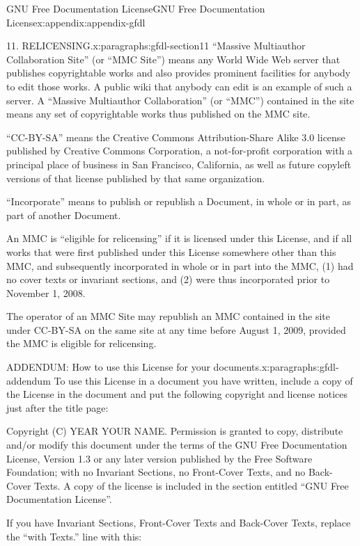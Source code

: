 \documentclass[oneside,10pt,]{book}
\numberwithin{equation}{section}
\begin{document}
\begin{appendixptx}{GNU Free Documentation License}{}{GNU Free Documentation License}{}{}{x:appendix:appendix-gfdl}
\begin{paragraphs}{11. RELICENSING.}{x:paragraphs:gfdl-section11}
``Massive Multiauthor Collaboration Site'' (or ``MMC Site'') means any World Wide Web server that publishes copyrightable works and also provides prominent facilities for anybody to edit those works. A public wiki that anybody can edit is an example of such a server. A ``Massive Multiauthor Collaboration'' (or ``MMC'') contained in the site means any set of copyrightable works thus published on the MMC site.%
\par
``CC-BY-SA'' means the Creative Commons Attribution-Share Alike 3.0 license published by Creative Commons Corporation, a not-for-profit corporation with a principal place of business in San Francisco, California, as well as future copyleft versions of that license published by that same organization.%
\par
``Incorporate'' means to publish or republish a Document, in whole or in part, as part of another Document.%
\par
An MMC is ``eligible for relicensing'' if it is licensed under this License, and if all works that were first published under this License somewhere other than this MMC, and subsequently incorporated in whole or in part into the MMC, (1) had no cover texts or invariant sections, and (2) were thus incorporated prior to November 1, 2008.%
\par
The operator of an MMC Site may republish an MMC contained in the site under CC-BY-SA on the same site at any time before August 1, 2009, provided the MMC is eligible for relicensing.%
\end{paragraphs}%
\begin{paragraphs}{ADDENDUM: How to use this License for your documents.}{x:paragraphs:gfdl-addendum}%
To use this License in a document you have written, include a copy of the License in the document and put the following copyright and license notices just after the title page:%
\begin{preformatted}
Copyright (C)  YEAR  YOUR NAME. Permission is granted to
       copy, distribute and/or modify this document under the terms of
       the GNU Free Documentation License, Version 1.3 or any later
       version published by the Free Software Foundation; with no
       Invariant Sections, no Front-Cover Texts, and no Back-Cover
       Texts. A copy of the license is included in the section entitled
       ``GNU Free Documentation License''.
\end{preformatted}
If you have Invariant Sections, Front-Cover Texts and Back-Cover Texts, replace the ``with\textellipsis{} Texts.'' line with this:%

\end{paragraphs}
\end{appendixptx}
\end{document}
